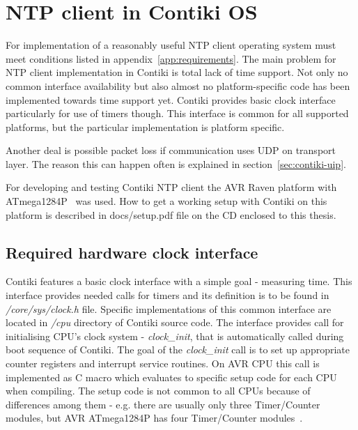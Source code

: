 
\chapter{NTP client in Contiki OS}

For implementation of a reasonably useful NTP client
operating system must meet conditions listed in appendix~\ref{app:requirements}.
The main problem for NTP client implementation in Contiki is total
lack of time support.
Not only no common interface availability but also
almost no platform-specific code has been implemented towards time support yet.
Contiki provides basic clock interface particularly for use of timers though.
This interface is common for all supported platforms,
but the particular implementation is platform specific.

Another deal is possible packet loss if communication uses UDP on transport layer.
The reason this can happen often is explained in section~\ref{sec:contiki-uip}.

For developing and testing Contiki NTP client the AVR Raven platform with ATmega1284P~\cite{avr-datasheet} was used.
How to get a working setup with Contiki on this platform is described in
docs/setup.pdf file on the CD enclosed to this thesis.

\section{Required hardware clock interface}
Contiki features a basic clock interface with a simple goal - measuring time.
This interface provides needed calls for timers and its definition is to be found in {\it{/core/sys/clock.h}} file.
Specific implementations of this common interface are located in {\it{/cpu}} directory of Contiki source code.
The interface provides call for initialising CPU's clock system - {\it{clock\_init}}, that is automatically called during
boot sequence of Contiki.
The goal of the {\it{clock\_init}} call is to set up
appropriate counter registers and interrupt service routines. %
On AVR CPU this call is implemented as C macro which evaluates to specific setup code for each CPU
when compiling.
The setup code is not common to all CPUs because of differences among them - e.g. there are usually
only three Timer/Counter modules, but AVR ATmega1284P has four Timer/Counter modules~\cite{avr-datasheet}.

